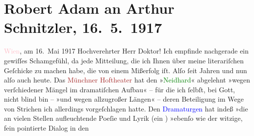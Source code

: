 

               \section[Robert Adam an Arthur Schnitzler, 16. 5. 1917]{ Robert Adam an Arthur Schnitzler, 16. 5. 1917}\nopagebreak{}\rehead{ }\normalsize\beginnumbering{} \toendnotes[C]{\smallbreak\pagebreak[2]} 
\toendnotes[C]{\smallbreak}\pstart
           \raggedleft{}{\pb}\textcolor{pink}{Wien}{}\ledrightnote{\textcolor{pink}{Wien}}, am 16. Mai 1917\pend
           \pstart\center{}Hochverehrter Herr Doktor!\pend\pstart
           Ich empfinde nachgerade ein gewiſſes Schamgefühl, da jede Mitteilung, die ich Ihnen
               über meine literariſchen Geſchicke zu machen habe, die von einem Mißerfolg iſt. Alſo
               ſeit Jahren und nun alſo auch heute.\pend
           \pstart
           Das \textcolor{brown}{Münchner Hoftheater}{}\ledrightnote{\textcolor{brown}{Königliche Hof- und Nationaltheater München}} hat den »\textcolor{green}{Neidhard}{}\ledrightnote{\textcolor{green}{Neidhard}}« abgelehnt »wegen verſchiedener Mängel im dramatiſchen
               Aufbau« –  für die ich ſelbſt, bei Gott,
               nicht blind bin – »und wegen allzugroßer Längen« – deren Beteiligung im Wege von
               Strichen ich allerdings vorgeſchlagen hatte. Den {\pb}\textcolor{blue}{Dramaturgen}{} hat indeß »die an
               vielen Stellen aufleuchtende Poeſie und Lyrik (ein \label{K_L02260_1v}\label{K_L02260_1h}) »ebenſo wie der witzige, fein pointierte Dialog in den
